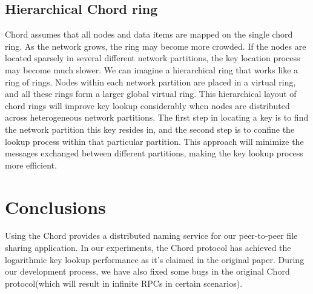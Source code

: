 \documentclass[letterpaper,twocolumn,10pt]{article}
\begin{document}
\subsection{Hierarchical Chord ring}
Chord assumes that all nodes and data items are mapped on the single chord ring. As the network grows, the ring may become more crowded. If the nodes are located sparsely in several different network partitions, the key location process may become much slower. We can imagine a hierarchical ring that works like a ring of rings. Nodes within each network partition are placed in a virtual ring, and all these rings form a larger global virtual ring. This hierarchical layout of chord rings will improve key lookup considerably when nodes are distributed across heterogeneous network partitions. The first step in locating a key is to find the network partition this key resides in, and the second step is to confine the lookup process within that particular partition. This approach will minimize the messages exchanged between different partitions, making the key lookup process more efficient.

\section{Conclusions}
Using the Chord provides a distributed naming service for our peer-to-peer file sharing application. In our experiments, the Chord protocol has achieved the logarithmic key lookup performance as it's claimed in the original paper. During our development process, we have also fixed some bugs in the original Chord protocol(which will result in infinite RPCs in certain scenarios).







\end{document}
